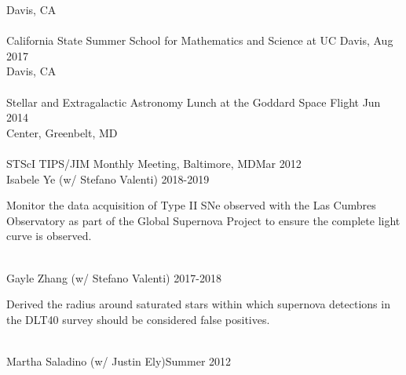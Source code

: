 \documentclass[10pt]{cv}
\begin{document}
\begin{llist}
Davis, CA\\ \vspace{-0.1in}  %
\\
California State Summer School for Mathematics and Science at UC Davis, \hfill Aug 2017\\ 
 Davis, CA \\ \vspace{-0.1in}  %
\\
Stellar and Extragalactic Astronomy Lunch at the Goddard Space Flight  \hfill Jun 2014\\  
Center, Greenbelt, MD \\ \vspace{-0.1in}  %
\\
STScI TIPS/JIM Monthly Meeting, Baltimore, MD\hfill Mar 2012\\\vspace{-0.1in}  
\vspace{-0.1in}  
Isabele Ye (w/ Stefano Valenti) \hfill 2018-2019\\
\begin{minipage}[l]{0.7\textwidth}\vspace{0.15cm}
Monitor the data acquisition of Type II SNe observed with the Las Cumbres Observatory as part of the Global Supernova Project to ensure the complete light curve is observed.\\
\end{minipage}\vspace{0.15cm}
\\
Gayle Zhang (w/ Stefano Valenti) \hfill 2017-2018\\
\begin{minipage}[l]{0.7\textwidth}\vspace{0.15cm}
Derived the radius around saturated stars within which supernova detections in the DLT40 survey should be considered false positives.\\
\end{minipage}\vspace{0.15cm}
\\
Martha Saladino (w/ Justin Ely)\hfill Summer 2012\\
\begin{minipage}[l]{0.7\textwidth}\vspace{0.15cm}

\end{minipage}
\end{llist}
\end{document}

